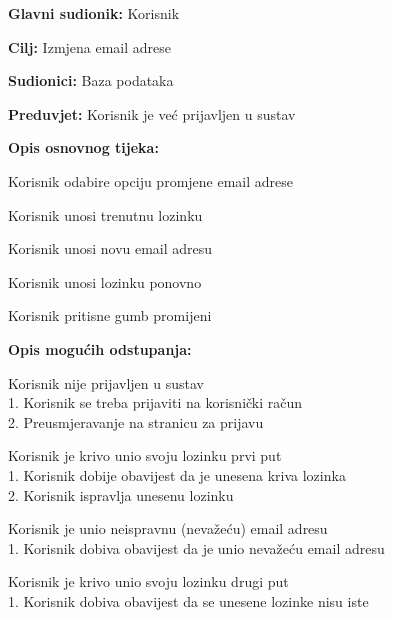 					\noindent {}
					\begin{packed_item}
						\item \textbf{Glavni sudionik:} Korisnik
						\item \textbf{Cilj:} Izmjena email adrese
						\item \textbf{Sudionici:} Baza podataka
						\item \textbf{Preduvjet:} Korisnik je već prijavljen u sustav
						\item \textbf{Opis osnovnog tijeka:}
						\begin{packed_enum}
							\item Korisnik odabire opciju promjene email adrese
							\item Korisnik unosi trenutnu lozinku
							\item Korisnik unosi novu email adresu
							\item Korisnik unosi lozinku ponovno
							\item Korisnik pritisne gumb promijeni
						\end{packed_enum}
						\item \textbf{Opis mogućih odstupanja:}
						\begin{packed_item}
							\item [1.a] Korisnik nije prijavljen u sustav
							\\1. Korisnik se treba prijaviti na korisnički račun
							\\2. Preusmjeravanje na stranicu za prijavu
							\item [2.a] Korisnik je krivo unio svoju lozinku prvi put
							\\1. Korisnik dobije obavijest da je unesena kriva lozinka
							\\2. Korisnik ispravlja unesenu lozinku
							\item [3.a] Korisnik je unio neispravnu (nevažeću) email adresu
							\\1. Korisnik dobiva obavijest da je unio nevažeću email adresu
							\item [4.a] Korisnik je krivo unio svoju lozinku drugi put
							\\1. Korisnik dobiva obavijest da se unesene lozinke nisu iste
						\end{packed_item}
					\end{packed_item}

